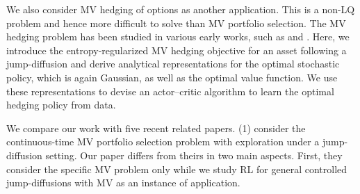 \documentclass[11pt]{article}
\newcommand{\1}{\mathbbm{1}}
\begin{document}
We also consider MV hedging of options as another application. This is a non-LQ problem and hence more difficult to solve than MV portfolio selection. The MV hedging problem has been studied in various early works, such as \cite{schweizer1996approximation,schweizer2001guided} and \cite{lim2005mean}. Here, we introduce the entropy-regularized MV hedging objective for an asset following a jump-diffusion and derive analytical representations for the optimal stochastic policy, which is again Gaussian, as well as the optimal value function. We use these representations to devise an actor--critic algorithm to learn the optimal hedging policy from data.

We compare our work with five recent related papers. (1) \cite{bender2023entropy} consider the continuous-time MV portfolio selection problem with exploration under a jump-diffusion setting. {Our paper differs from theirs in two main aspects. First, they consider the specific MV problem only while we study RL for general controlled jump-diffusions with MV as an instance of application.
}
\end{document}
